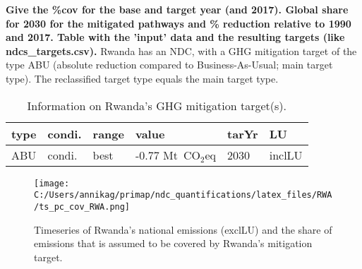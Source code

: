 \documentclass[12pt]{article}
\begin{document}
 \textbf{ 
 Give the \%cov for the base and target year (and 2017). \newline
 Global share for 2030 for the mitigated pathways and \% reduction relative to 1990 and 2017. \newline
 Table with the 'input' data and the resulting targets (like ndcs\_targets.csv). \newline}
 Rwanda has an NDC, with a GHG mitigation target of the type ABU (absolute reduction compared to Business-As-Usual; main target type).
 The reclassified target type equals the main target type.

 \begin{table}[H]
 \centering
 \caption{Information on Rwanda's GHG mitigation target(s).}
 \label{tab:mitiTars}
 \begin{tabular}{l l l l l l }
 \bfseries type & \bfseries condi. & \bfseries range & \bfseries value & \bfseries tarYr & \bfseries LU \tabularnewline \hline \hline
 ABU & condi. & best & -0.77 Mt~CO$_2$eq & 2030 & inclLU \tabularnewline 
 \end{tabular}
 \end{table}

 \begin{figure}[H]
 \centering
 \texttt{[image: C:/Users/annikag/primap/ndc\_quantifications/latex\_files/RWA/ts\_pc\_cov\_RWA.png]}
 \caption{Timeseries of Rwanda's national emissions (exclLU) and the share of emissions that is assumed to be covered by Rwanda's mitigation target.}
 \label{fig:tsPcCov}
 \end{figure}
\end{document}
